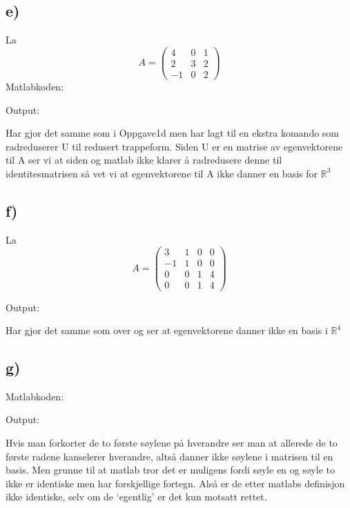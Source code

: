 \documentclass[a4paper, norsk, twoside, 10pt]{article}
\begin{document}
\subsection*{e)}

\def\matriseAE{
  \begin{pmatrix}
    4 & 0 & 1 \\
    2 & 3 & 2 \\
    -1 & 0 & 2
  \end{pmatrix}
}

La \[A = \matriseAE\]
Matlabkoden:

Output:


Har gjor det samme som i Oppgave1d men har lagt til en ekstra komando som radreduserer U til redusert trappeform. Siden U er en matrise av egenvektorene til A ser vi at siden og matlab ikke klarer å radredusere denne til identitesmatrisen så vet vi at egenvektorene til A ikke danner en basis for $\mathbb{R}^{3}$

\newpage

\subsection*{f)}
\def\matriseAF{
  \begin{pmatrix}
    3 & 1 & 0 & 0 \\
    -1 & 1 & 0 & 0 \\
    0 & 0 & 1 & 4 \\
    0 & 0 & 1 & 4 
  \end{pmatrix}
}
La \[A = \matriseAF \]

Output:


Har gjor det samme som over og ser at egenvektorene danner ikke en basis i $\mathbb{R}^{4}$



\subsection*{g)}
Matlabkoden:

Output:


Hvis man forkorter de to første søylene på hverandre ser man at allerede de to første radene kanselerer hverandre, altså danner ikke søylene i matrisen til en basis. Men grunne til at matlab tror det er muligens fordi søyle en og søyle to ikke er identiske men har forskjellige fortegn. Alså er de etter matlabs definisjon ikke identiske, selv om de `egentlig' er det kun motsatt rettet.
\end{document}
